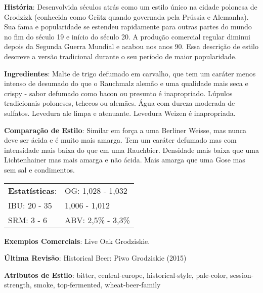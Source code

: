 \textbf{História}: Desenvolvida séculos atrás como um estilo único na cidade polonesa de Grodzizk (conhecida como Grätz quando governada pela Prússia e Alemanha). Sua fama e popularidade se estendeu rapidamente para outras partes do mundo no fim do século 19 e início do século 20. A produção comercial regular diminui depois da Segunda Guerra Mundial e acabou nos anos 90. Essa descrição de estilo descreve a versão tradicional durante o seu período de maior popularidade.

\textbf{Ingredientes}: Malte de trigo defumado em carvalho, que tem um caráter menos intenso de desumado do que o Rauchmalz alemão e uma qualidade mais seca e crispy - sabor defumado como bacon ou presunto é inapropriado. Lúpulos tradicionais poloneses, tchecos ou alemães. Água com dureza moderada de sulfatos. Levedura ale limpa e atenuante. Levedura Weizen é inapropriada.

\textbf{Comparação de Estilo}: Similar em força a uma Berliner Weisse, mas nunca deve ser ácida e é muito mais amarga. Tem um caráter defumado mas com intensidade mais baixa do que em uma Rauchbier. Densidade mais baixa que uma Lichtenhainer mas mais amarga e não ácida. Mais amarga que uma Gose mas sem sal e condimentos.

\begin{tabular}{@{}p{35mm}p{35mm}@{}}
  \textbf{Estatísticas}: & OG: 1,028 - 1,032 \\
  IBU: 20 - 35  & 1,006 - 1,012  \\
  SRM: 3 - 6 & ABV: 2,5\% - 3,3\%
\end{tabular}

\textbf{Exemplos Comerciais}: Live Oak Grodziskie.

\textbf{Última Revisão}: Historical Beer: Piwo Grodziskie (2015)

\textbf{Atributos de Estilo}: bitter, central-europe, historical-style, pale-color, session-strength, smoke, top-fermented, wheat-beer-family
